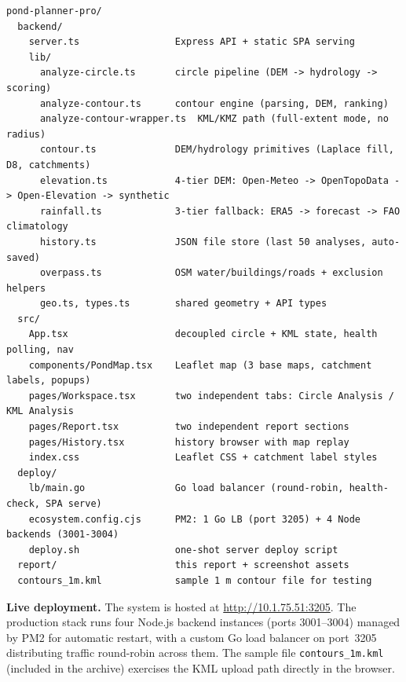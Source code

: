\documentclass[manuscript,screen,review]{acmart}
\begin{document}
\begin{verbatim}
pond-planner-pro/
  backend/
    server.ts                 Express API + static SPA serving
    lib/
      analyze-circle.ts       circle pipeline (DEM -> hydrology -> scoring)
      analyze-contour.ts      contour engine (parsing, DEM, ranking)
      analyze-contour-wrapper.ts  KML/KMZ path (full-extent mode, no radius)
      contour.ts              DEM/hydrology primitives (Laplace fill, D8, catchments)
      elevation.ts            4-tier DEM: Open-Meteo -> OpenTopoData -> Open-Elevation -> synthetic
      rainfall.ts             3-tier fallback: ERA5 -> forecast -> FAO climatology
      history.ts              JSON file store (last 50 analyses, auto-saved)
      overpass.ts             OSM water/buildings/roads + exclusion helpers
      geo.ts, types.ts        shared geometry + API types
  src/
    App.tsx                   decoupled circle + KML state, health polling, nav
    components/PondMap.tsx    Leaflet map (3 base maps, catchment labels, popups)
    pages/Workspace.tsx       two independent tabs: Circle Analysis / KML Analysis
    pages/Report.tsx          two independent report sections
    pages/History.tsx         history browser with map replay
    index.css                 Leaflet CSS + catchment label styles
  deploy/
    lb/main.go                Go load balancer (round-robin, health-check, SPA serve)
    ecosystem.config.cjs      PM2: 1 Go LB (port 3205) + 4 Node backends (3001-3004)
    deploy.sh                 one-shot server deploy script
  report/                     this report + screenshot assets
  contours_1m.kml             sample 1 m contour file for testing
\end{verbatim}

\textbf{Live deployment.} The system is hosted at
\url{http://10.1.75.51:3205}. The production stack runs four
Node.js backend instances (ports 3001--3004) managed by PM2 for
automatic restart, with a custom Go load balancer on port~3205 distributing
traffic round-robin across them. The sample file
\texttt{contours\_1m.kml} (included in the archive) exercises the KML
upload path directly in the browser.
\end{document}
